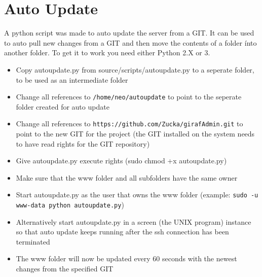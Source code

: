 \section{Auto Update}
A python script was made to auto update the server from a GIT. It can be used to auto pull new changes from a GIT and then move the contents of a folder ínto another folder. To get it to work you need either Python 2.X or 3.
\begin{itemize}
\item Copy autoupdate.py from source/scripts/autoupdate.py to a seperate folder, to be used as an intermediate folder
\item Change all references to \texttt{/home/neo/autoupdate} to point to the seperate folder created for auto update
\item Change all references to \texttt{https://github.com/Zucka/girafAdmin.git} to point to the new GIT for the project (the GIT installed on the system needs to have read rights for the GIT repository)
\item Give autoupdate.py execute rights (sudo chmod +x autoupdate.py)
\item Make sure that the www folder and all subfolders have the same owner
\item Start autoupdate.py as the user that owns the www folder (example: \texttt{sudo -u www-data python autoupdate.py})
\item Alternatively start autoupdate.py in a screen (the UNIX program) instance so that auto update keeps running after the ssh connection has been terminated
\item The www folder will now be updated every 60 seconds with the newest changes from the specified GIT
\end{itemize}
